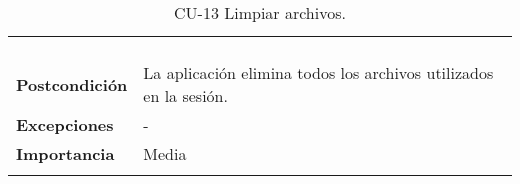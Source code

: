 \begin{longtable}[H]{@{}ll@{}}
\begin{minipage}[t]{0.71\columnwidth}
\begin{enumerate}
\end{enumerate}\strut
\end{minipage}\tabularnewline
\begin{minipage}[t]{0.23\columnwidth}\raggedright\strut
\textbf{Postcondición}\strut
\end{minipage} & \begin{minipage}[t]{0.71\columnwidth}\raggedright\strut
La aplicación elimina todos los archivos utilizados en la sesión.
\end{minipage}\tabularnewline
\begin{minipage}[t]{0.23\columnwidth}\raggedright\strut
\textbf{Excepciones}\strut
\end{minipage} & \begin{minipage}[t]{0.71\columnwidth}\raggedright\strut
-\strut
\end{minipage}\tabularnewline
\begin{minipage}[t]{0.23\columnwidth}\raggedright\strut
\textbf{Importancia}\strut
\end{minipage} & \begin{minipage}[t]{0.71\columnwidth}\raggedright\strut
Media\strut
\end{minipage}\tabularnewline
\bottomrule
\caption{CU-13 Limpiar archivos.}
\end{longtable}
\strut
